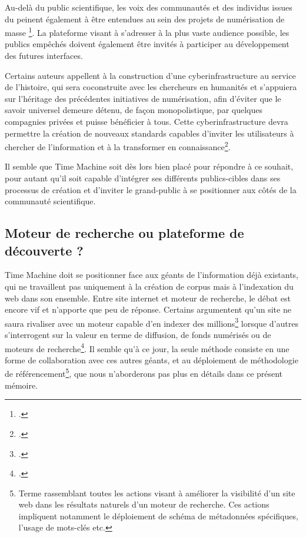 Au-delà du public scientifique, les voix des communautés et des individus issues du  peinent également à être entendues au sein des projets de numérisation de masse \footcite{thelle_persuasive_2011}. La plateforme visant à s'adresser à la plus vaste audience possible, les publics empêchés doivent également être invités à participer au développement des futures interfaces.

Certains auteurs appellent à la construction d'une cyberinfrastructure au service de l'histoire, qui sera coconstruite avec les chercheurs en humanités et s'appuiera sur l'héritage des précédentes initiatives de numérisation, afin d'éviter que le savoir universel demeure détenu, de façon monopolistique, par quelques compagnies privées et puisse bénéficier à tous. Cette cyberinfrastructure devra permettre la création de nouveaux standards capables d'inviter les utilisateurs à chercher de l'information et à la transformer en connaissance\footcite{clavert_histoire_2013}. 

Il semble que Time Machine soit dès lors bien placé pour répondre à ce souhait, pour autant qu'il soit capable d'intégrer ses différents publics-cibles dans ses processus de création et d'inviter le grand-public à se positionner aux côtés de la communauté scientifique.


\subsection{Moteur de recherche ou plateforme de découverte ?}

Time Machine doit se positionner face aux géants de l'information déjà existants, qui ne travaillent pas uniquement à la création de corpus mais à l'indexation du web dans son ensemble. Entre site internet et moteur de recherche, le débat est encore vif et n'apporte que peu de réponse. Certains argumentent qu'un site ne saura rivaliser avec un moteur capable d'en indexer des millions\footcite{moatti_bibliotheque_2012} lorsque d'autres s'interrogent sur la valeur en terme de diffusion, de fonds numérisés ou de moteurs de recherche\footcite{dufrene_numerisation_2013}. Il semble qu'à ce jour, la seule méthode consiste en une forme de collaboration avec ces autres géants, et au déploiement de méthodologie de référencement\footnote{Terme rassemblant toutes les actions visant à améliorer la visibilité d'un site web dans les résultats naturels d'un moteur de recherche. Ces actions impliquent notamment le déploiement de schéma de métadonnées spécifiques, l'usage de mots-clés etc.}, que nous n'aborderons pas plus en détails dans ce présent mémoire.

